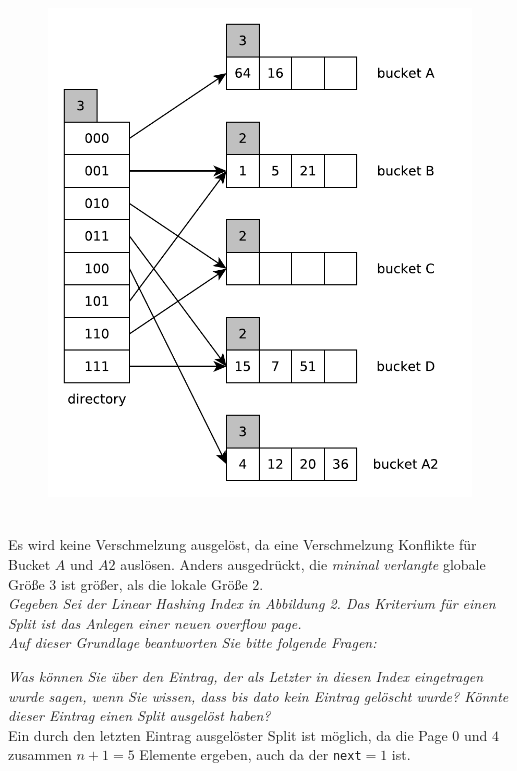 \documentclass{uni_tue_template}
\newcommand{\code}[1]{\texttt{{\footnotesize #1}}}
\begin{document}
  \begin{figure}[h!]
    \centering
    \includegraphics[scale=0.7]{graphml/01_5.pdf}
  \end{figure}\\
  Es wird keine Verschmelzung ausgelöst, da eine Verschmelzung Konflikte für Bucket $A$ und $A2$ auslösen. Anders ausgedrückt, die \emph{mininal verlangte} globale Größe $3$ ist größer, als die lokale Größe $2$.
  \newpage
\subExEnd{}
%
\newpage 
%
\exercise{}\\
\emph{Gegeben Sei der \emph{Linear Hashing Index} in Abbildung 2. Das Kriterium für einen Split ist das Anlegen einer neuen \emph{overflow page}.\\
Auf dieser Grundlage beantworten Sie bitte folgende Fragen:}
  \item \emph{Was können Sie über den Eintrag, der als Letzter in diesen Index eingetragen wurde sagen, wenn Sie wissen, dass bis dato kein Eintrag gelöscht wurde? Könnte dieser Eintrag einen Split ausgelöst haben?}\\
  Ein durch den letzten Eintrag ausgelöster Split ist möglich, da die Page $0$ und $4$ zusammen $n+1=5$ Elemente ergeben, auch da der \code{next}$=1$ ist. 
\end{document}

